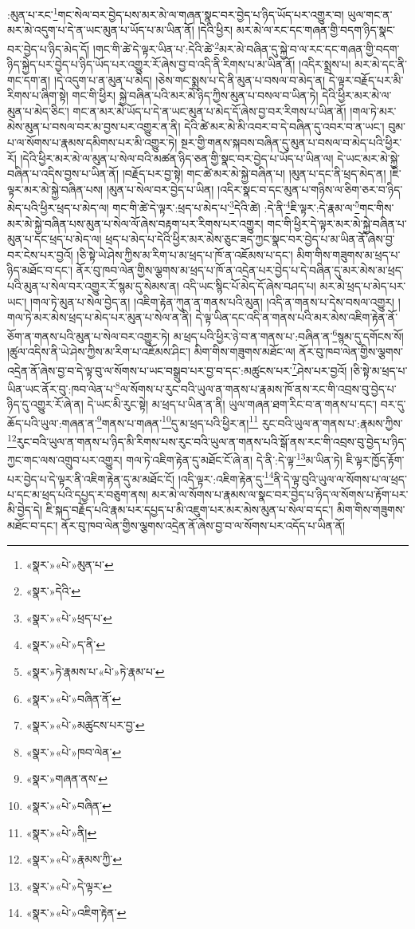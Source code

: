 :མུན་པ་རང་\footnote{«སྣར་»«པེ་»མུན་པ་}གང་སེལ་བར་བྱེད་པས་མར་མེ་ལ་གཞན་སྣང་བར་བྱེད་པ་ཉིད་ཡོད་པར་འགྱུར་བ། ཡུལ་གང་ན་མར་མེ་འདུག་པ་དེ་ན་ཡང་མུན་པ་ཡོད་པ་མ་ཡིན་ནོ། །དེའི་ཕྱིར། མར་མེ་ལ་རང་དང་གཞན་གྱི་བདག་ཉིད་སྣང་བར་བྱེད་པ་ཉིད་མེད་དོ། །གང་གི་ཚེ་དེ་ལྟར་ཡིན་པ་:དེའི་ཚེ་\footnote{«སྣར་»དེའི་}མར་མེ་བཞིན་དུ་སྐྱེ་བ་ལ་རང་དང་གཞན་གྱི་བདག་ཉིད་སྐྱེད་པར་བྱེད་པ་ཉིད་ཡོད་པར་འགྱུར་རོ་ཞེས་བྱ་བ་འདི་ནི་རིགས་པ་མ་ཡིན་ནོ། །འདིར་སྨྲས་པ། མར་མེ་དང་ནི་གང་དག་ན། །དེ་འདུག་པ་ན་མུན་པ་མེད། །ཅེས་གང་སྨྲས་པ་དེ་ནི་མུན་པ་བསལ་བ་མེད་ན། དེ་ལྟར་བརྗོད་པར་མི་རིགས་པ་ཞིག་སྟེ། གང་གི་ཕྱིར། སྐྱེ་བཞིན་པའི་མར་མེ་ཉིད་ཀྱིས་མུན་པ་བསལ་བ་ཡིན་ཏེ། དེའི་ཕྱིར་མར་མེ་ལ་མུན་པ་མེད་ཅིང་། གང་ན་མར་མེ་ཡོད་པ་དེ་ན་ཡང་མུན་པ་མེད་དོ་ཞེས་བྱ་བར་རིགས་པ་ཡིན་ནོ། །གལ་ཏེ་མར་མེས་མུན་པ་བསལ་བར་མ་བྱས་པར་འགྱུར་ན་ནི། དེའི་ཚེ་མར་མེ་མི་འབར་བ་དེ་བཞིན་དུ་འབར་བ་ན་ཡང་། བུམ་པ་ལ་སོགས་པ་རྣམས་དམིགས་པར་མི་འགྱུར་ཏེ། སྔར་གྱི་གནས་སྐབས་བཞིན་དུ་མུན་པ་བསལ་བ་མེད་པའི་ཕྱིར་རོ། །དེའི་ཕྱིར་མར་མེ་ལ་མུན་པ་སེལ་བའི་མཚན་ཉིད་ཅན་གྱི་སྣང་བར་བྱེད་པ་ཡོད་པ་ཡིན་ལ། དེ་ཡང་མར་མེ་སྐྱེ་བཞིན་པ་འདིས་བྱས་པ་ཡིན་ནོ། །བརྗོད་པར་བྱ་སྟེ། གང་ཚེ་མར་མེ་སྐྱེ་བཞིན་པ། །མུན་པ་དང་ནི་ཕྲད་མེད་ན། །ཇི་ལྟར་མར་མེ་སྐྱེ་བཞིན་པས། །མུན་པ་སེལ་བར་བྱེད་པ་ཡིན། །འདིར་སྣང་བ་དང་མུན་པ་གཉིས་ལ་ཅིག་ཅར་བ་ཉིད་མེད་པའི་ཕྱིར་ཕྲད་པ་མེད་ལ། གང་གི་ཚེ་དེ་ལྟར་:ཕྲད་པ་མེད་པ་\footnote{«སྣར་»«པེ་»ཕྲད་པ་}དེའི་ཚེ། :དེ་ནི་\footnote{«སྣར་»«པེ་»ད་ནི་}ཇི་ལྟར་:དེ་རྣམ་ལ་\footnote{«སྣར་»ཏེ་རྣམས་པ་«པེ་»ཏེ་རྣམ་པ་}གང་གིས་མར་མེ་སྐྱེ་བཞིན་པས་མུན་པ་སེལ་ལོ་ཞེས་བརྟག་པར་རིགས་པར་འགྱུར། གང་གི་ཕྱིར་དེ་ལྟར་མར་མེ་སྐྱེ་བཞིན་པ་མུན་པ་དང་ཕྲད་པ་མེད་ལ། ཕྲད་པ་མེད་པ་དེའི་ཕྱིར་མར་མེས་ཅུང་ཟད་ཀྱང་སྣང་བར་བྱེད་པ་མ་ཡིན་ནོ་ཞེས་བྱ་བར་ངེས་པར་བྱའོ། །ཅི་སྟེ་ཡེ་ཤེས་ཀྱིས་མ་རིག་པ་མ་ཕྲད་པ་ཁོ་ན་འཇོམས་པ་དང་། མིག་གིས་གཟུགས་མ་ཕྲད་པ་ཉིད་མཐོང་བ་དང་། ནོར་བུ་ཁབ་ལེན་གྱིས་ལྕགས་མ་ཕྲད་པ་ཁོ་ན་འདྲེན་པར་བྱེད་པ་དེ་བཞིན་དུ་མར་མེས་མ་ཕྲད་པའི་མུན་པ་སེལ་བར་འགྱུར་རོ་སྙམ་དུ་སེམས་ན། འདི་ཡང་སྙིང་པོ་མེད་དོ་ཞེས་བཤད་པ། མར་མེ་ཕྲད་པ་མེད་པར་ཡང་། །གལ་ཏེ་མུན་པ་སེལ་བྱེད་ན། །འཇིག་རྟེན་ཀུན་ན་གནས་པའི་མུན། །འདི་ན་གནས་པ་དེས་བསལ་འགྱུར། །གལ་ཏེ་མར་མེས་ཕྲད་པ་མེད་པར་མུན་པ་སེལ་ན་ནི། དེ་ལྟ་ཡིན་དང་འདི་ན་གནས་པའི་མར་མེས་འཇིག་རྟེན་ནོ་ཅོག་ན་གནས་པའི་མུན་པ་སེལ་བར་འགྱུར་ཏེ། མ་ཕྲད་པའི་ཕྱིར་ཉེ་བ་ན་གནས་པ་:བཞིན་ན་\footnote{«སྣར་»«པེ་»བཞིན་ནོ་}སྙམ་དུ་དགོངས་སོ། །ཚུལ་འདིས་ནི་ཡེ་ཤེས་ཀྱིས་མ་རིག་པ་འཇོམས་ཤིང་། མིག་གིས་གཟུགས་མཐོང་ལ། ནོར་བུ་ཁབ་ལེན་གྱིས་ལྕགས་འདྲེན་ནོ་ཞེས་བྱ་བ་དེ་ལྟ་བུ་ལ་སོགས་པ་ཡང་བསྒྲུབ་པར་བྱ་བ་དང་:མཚུངས་པར་\footnote{«སྣར་»«པེ་»མཚུངས་པར་བྱ་}ཤེས་པར་བྱའོ། །ཅི་སྟེ་མ་ཕྲད་པ་ཡིན་ཡང་ནོར་བུ་:ཁབ་ལེན་པ་\footnote{«སྣར་»«པེ་»ཁབ་ལེན་}ལ་སོགས་པ་རུང་བའི་ཡུལ་ན་གནས་པ་རྣམས་ཁོ་ནས་རང་གི་འབྲས་བུ་བྱེད་པ་ཉིད་དུ་འགྱུར་རོ་ཞེ་ན། དེ་ཡང་མི་རུང་སྟེ། མ་ཕྲད་པ་ཡིན་ན་ནི། ཡུལ་གཞན་ཐག་རིང་བ་ན་གནས་པ་དང་། བར་དུ་ཆོད་པའི་ཡུལ་:གཞན་ན་\footnote{«སྣར་»གཞན་ནས་}གནས་པ་གཞན་\footnote{«སྣར་»«པེ་»བཞིན་}དུ་མ་ཕྲད་པའི་ཕྱིར་ན།\footnote{«སྣར་»«པེ་»ནི།} རུང་བའི་ཡུལ་ན་གནས་པ་:རྣམས་ཀྱིས་\footnote{«སྣར་»«པེ་»རྣམས་ཀྱི་}རུང་བའི་ཡུལ་ན་གནས་པ་ཉིད་མི་རིགས་པས་རུང་བའི་ཡུལ་ན་གནས་པའི་སྒོ་ནས་རང་གི་འབྲས་བུ་བྱེད་པ་ཉིད་ཀྱང་གང་ལས་འགྲུབ་པར་འགྱུར། གལ་ཏེ་འཇིག་རྟེན་དུ་མཐོང་ངོ་ཞེ་ན། དེ་ནི་:དེ་ལྟ་\footnote{«སྣར་»«པེ་»དེ་ལྟར་}མ་ཡིན་ཏེ། ཇི་ལྟར་ཁྱོད་རྟོག་པར་བྱེད་པ་དེ་ལྟར་ནི་འཇིག་རྟེན་དུ་མ་མཐོང་ངོ། །འདི་ལྟར་:འཇིག་རྟེན་དུ་\footnote{«སྣར་»«པེ་»འཇིག་རྟེན་}ནི་དེ་ལྟ་བུའི་ཡུལ་ལ་སོགས་པ་ལ་ཕྲད་པ་དང་མ་ཕྲད་པའི་དཔྱད་ར་བཅུག་ནས། མར་མེ་ལ་སོགས་པ་རྣམས་ལ་སྣང་བར་བྱེད་པ་ཉིད་ལ་སོགས་པ་རྟོག་པར་མི་བྱེད་དེ། ཇི་སྐད་བརྗོད་པའི་རྣམ་པར་དཔྱད་པ་མི་འཇུག་པར་མར་མེས་མུན་པ་སེལ་བ་དང་། མིག་གིས་གཟུགས་མཐོང་བ་དང་། ནོར་བུ་ཁབ་ལེན་གྱིས་ལྕགས་འདྲེན་ནོ་ཞེས་བྱ་བ་ལ་སོགས་པར་འདོད་པ་ཡིན་ནོ། 